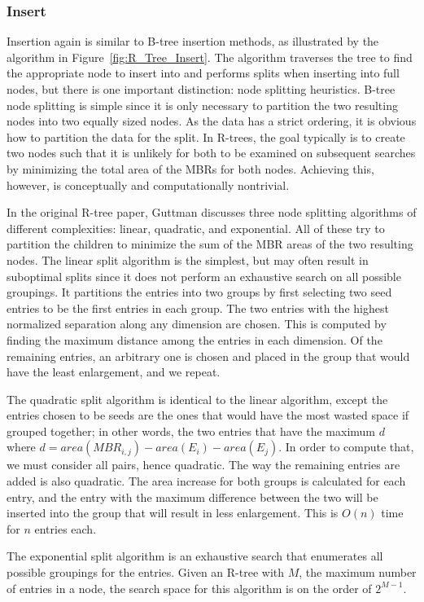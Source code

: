 \subsubsection{Insert}
Insertion again is similar to B-tree insertion methods, as illustrated by the 
algorithm in Figure~\ref{fig:R_Tree_Insert}. The algorithm traverses the tree 
to find the appropriate node to insert into and performs splits when inserting
into full nodes, but there is one important distinction: node splitting 
heuristics. B-tree node splitting is simple since it is only necessary to 
partition the two resulting nodes into two equally sized nodes.
As the data has a strict ordering, it is obvious how to partition the data for the split.
In R-trees, the 
goal typically is to create two nodes such that it is unlikely for both to be
examined on subsequent searches by minimizing the total area of the MBRs for
both nodes.
Achieving this, however, is conceptually and computationally nontrivial.

In the original R-tree paper, Guttman discusses three node 
splitting algorithms of different complexities: linear, quadratic, and 
exponential.
All of these try to partition the children to minimize the sum of the MBR areas of the two resulting nodes.
The linear split algorithm is the simplest, but may often
result in suboptimal splits since it does not perform an exhaustive search on
all possible groupings. It partitions the entries into two groups by first 
selecting two seed entries to be the first entries in each group.
The two entries with the highest normalized separation along any dimension are chosen.
This is computed by finding the maximum distance among the entries in each dimension.
Of the remaining entries, an arbitrary one is chosen and placed in the group that 
would have the least enlargement, and we repeat.

The quadratic split algorithm is identical to the linear algorithm, except the 
entries chosen to be seeds are the ones that would have the most wasted space
if grouped together; in other words, the two entries that have the maximum $d$
where $d = area(MBR_{i,j}) - area(E_{i}) - area(E_{j}) $.
In order to compute that, we must consider all pairs, hence quadratic.
The way the remaining entries are added is also quadratic. 
The area increase for both groups is calculated for each
entry, and the entry with the maximum difference between the two will be inserted 
into the group that will result in less enlargement.
This is $O(n)$ time for $n$ entries each.

The exponential split algorithm is an exhaustive search that enumerates all possible
groupings for the entries. Given an R-tree with $M$, the maximum number of entries
in a node, the search space for this algorithm is on the order of $2^{M-1}$.

